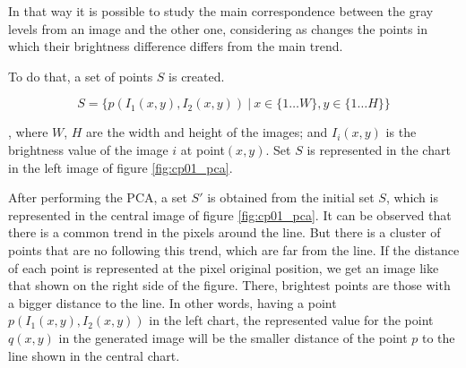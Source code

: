 In that way it is possible to study the main correspondence between the gray levels from an image and the other one, considering as changes the points in which their brightness difference differs from the main trend.

To do that, a set of points $S$ is created.

\begin{equation}\label{eq:cp01_brightness_relation}
S = \{ p(I_1(x, y), I_2(x,y)) ~|~ x \in \{1 \dots W\}, y \in \{1 \dots H\} \}
\end{equation}

, where $W$, $H$ are the width and height of the images; and $I_i(x, y)$ is the brightness value of the image $i$ at point$(x,y)$. Set $S$ is represented in the chart in the left image of figure \ref{fig:cp01_pca}.

After performing the \ac{PCA}, a set $S'$ is obtained from the initial set $S$, which is represented in the central image of figure \ref{fig:cp01_pca}. It can be observed that there is a common trend in the pixels around the line. But there is a cluster of points that are no following this trend, which are far from the line. If the distance of each point is represented at the pixel original position, we get an image like that shown on the right side of the figure. There, brightest points are those with a bigger distance to the line. In other words, having a point $p(I_1(x, y), I_2(x, y))$ in the left chart, the represented value for the point $q(x, y)$ in the generated image will be the smaller distance of the point $p$ to the line shown in the central chart.

